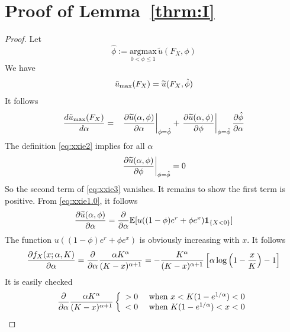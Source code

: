 \documentclass[11pt,a4]{amsart}
\newcommand{\pd}{\partial}
\newcommand{\wt}{\widetilde}
\newcommand{\E }{{\mathbb E}}
\newcommand{\1}{{\mathbf 1}}
\begin{document}
\section{Proof of Lemma~\ref{thrm:I}}
\setcounter{equation}{0}
\label{sec:thrmI_proof}
\begin{proof}
  Let
  \begin{equation}
    \label{eq:xxie2}
    \hat \phi := \underset{0 < \phi \leq 1}{\text{argmax}}\,
    \wt u(F_X, \phi)
  \end{equation}
  We have
  \[
  \tilde u_{\rm max}(F_X) = \wt u(F_X, \hat\phi)
  \]
  It follows
  \begin{eqnarray}
    {d \tilde u_{\rm max}(F_X) \over d \alpha}
    &=&
    \left.{\pd \wt u(\alpha, \phi) \over \pd \alpha}\right|_{\phi = \hat\phi}
    + \left.{\pd \wt u(\alpha, \phi) \over \pd \phi}\right|_{\phi = \hat\phi}
    {\pd \hat\phi \over \pd \alpha}
    \label{eq:xxie3}
  \end{eqnarray}
  The definition \eqref{eq:xxie2} implies for all $\alpha$
  \begin{equation}
    \label{eq:xxie4}
    \left.{\pd \wt u(\alpha, \phi) \over \pd \phi}\right|_{\phi = \hat\phi} = 0
  \end{equation}
  So the second term of \eqref{eq:xxie3} vanishes. It remains to show
  the first term is positive. From \eqref{eq:xxie1.0}, it follows
  \begin{eqnarray*}
    {\pd \wt u(\alpha, \phi) \over \pd \alpha}
    = {\partial \over \partial \alpha}\E[u((1 - \phi) e^r + \phi e^x) \1_{\{X < 0\}}]
  \end{eqnarray*}
  The function $u((1 - \phi) e^r + \phi e^x)$ is obviously
  increasing with $x$. It follows
  \begin{eqnarray*}
    {\pd f_X(x; \alpha, K) \over \pd \alpha}
    = {\partial \over \partial \alpha} {\alpha K^\alpha \over (K - x)^{\alpha + 1}} 
    = - {K^\alpha \over (K - x)^{\alpha + 1}}
    \left[
      \alpha
      \log\left(
        1 - {x \over K}
      \right) - 1
    \right]
  \end{eqnarray*}
  It is easily checked
  \[
  {\partial \over \partial \alpha}
  {\alpha K^\alpha \over (K - x)^{\alpha + 1}}
  \left\{
    \begin{array}{ll}
      > 0 & \text{ when } x < K(1 - e^{1/\alpha}) < 0 \\
      < 0 & \text{ when } K(1 - e^{1/\alpha}) < x < 0
    \end{array}
  \right.
  \]

\end{proof}
\end{document}
